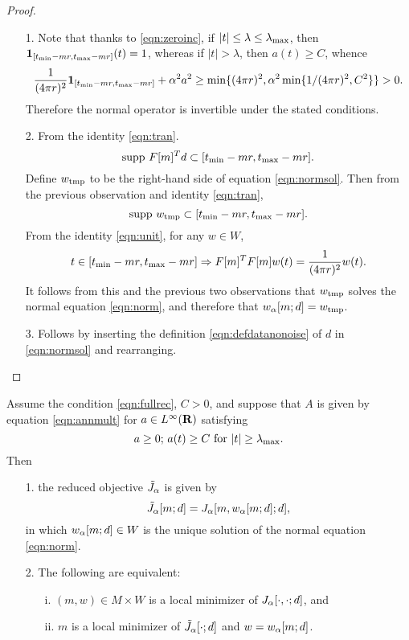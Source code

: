 \begin{proof} 
  \begin{itemize}
  \item[1. ]Note that thanks to \ref{eqn:zeroinc}, if $|t|\le
    \lambda \le \lambda_{\rm max}$, then ${\bf 1}_{[t_{\rm min}-mr,  
      t_{\rm max}-mr]}(t) = 1$, whereas if $|t|>\lambda$,
    then $a(t) \ge C$, whence
    \[
      \frac{1}{(4\pi r)^2}  {\bf 1}_{[t_{\rm min}-mr,  
        t_{\rm max}-mr]} + \alpha^2a^2  \ge \min\{(4\pi r)^2,
      \alpha^2\min\{1/(4\pi r)^2,C^2\} \}> 0.
    \]
    Therefore the normal operator is invertible under the stated
    conditions.

  \item[2. ]From the identity \ref{eqn:tran}.
    \[
      \mbox{supp }F[m]^Td \subset [t_{\rm min}-mr,t_{\rm max}-mr].
    \]
    Define $w_{\rm tmp}$ to be the right-hand side of equation \ref{eqn:normsol}. Then
    from the previous observation and identity \ref{eqn:tran},
    \[
      \mbox{supp }w_{\rm tmp} \subset [t_{\rm min}-mr,t_{\rm max}-mr].
    \]
    From the identity \ref{eqn:unit}, for any $w \in W$,
    \[
      t \in [t_{\rm min}-mr,t_{\rm max}-mr] \Rightarrow F[m]^TF[m]w(t)
      = \frac{1}{(4 \pi r)^2}w(t).
    \]
    It follows from this and the previous two observations that
    $w_{\rm tmp}$ solves the normal equation \ref{eqn:norm}, and
    therefore that $w_{\alpha}[m;d]=w_{\rm tmp}$.

  \item[3. ]Follows by inserting the definition
    \ref{eqn:defdatanonoise} of $d$ in \ref{eqn:normsol} and
    rearranging.
  \end{itemize}
\end{proof}

\begin{theorem}
  \label{thm:norminv}
  Assume the condition \ref{eqn:fullrec}, $C>0$, and suppose that $A$ is
  given by equation \ref{eqn:annmult} for $a \in L^{\infty}({\bf R})$
  satisfying
  \begin{equation}
    \label{eqn:abnd} 
    a \ge 0; \, a(t) \ge C\mbox{ for }|t| \ge \lambda_{\rm max}.
  \end{equation}
  Then \begin{itemize}
  \item[1. ]the reduced objective $\tilde{J}_{\alpha}$ is given by
    \begin{equation}
      \label{eqn:redexp1}
      \tilde{J}_{\alpha}[m;d] = J_{\alpha}[m,w_{\alpha}[m;d];d],
    \end{equation}
    in which $w_{\alpha}[m;d] \in W$ is the unique solution of the normal
    equation \ref{eqn:norm}.
  \item[2. ]The following are equivalent:
    \begin{itemize}
    \item[i. ]$(m,w) \in M \times W$ is a local minimizer of
      $J_{\alpha}[\cdot,\cdot;d]$, and
    \item[ii. ]$m$ is a local minimizer of $\tilde{J}_{\alpha}[\cdot;d]$ and
      $w=w_{\alpha}[m;d]$.
    \end{itemize}
  \end{itemize}
\end{theorem}

